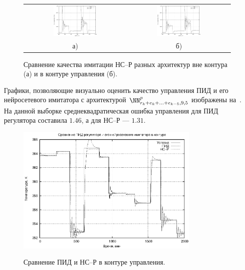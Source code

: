 \begin{figure}[h]
  \centering
  \begin{tabular}{cc}
    \includegraphics[width=0.45\textwidth,%
      totalheight=0.25\textheight]{cstr_e5r1_vs_e1r1_outloop_rus}
    &
    \includegraphics[width=0.45\textwidth,%
      totalheight=0.25\textheight]{cstr_e5r1_vs_e1r1_inloop_rus} \\
    а) & б) \\
  \end{tabular}
  \caption{Сравнение качества имитации НС--Р разных архитектур вне контура (а) и в контуре управления (б).}%
  \label{fig:cstr_pid_vs_nnc_contest_rus}
\end{figure}

Графики, позволяющие визуально оценить качество управления ПИД и его
нейросетевого имитатора с архитектурой
$\NN^p_{r_k+e_k+\ldots+e_{k-5},9,5}$ изображены
на~.  На данной выборке
среднеквадратическая ошибка управления для ПИД регулятора составила
$1.46$, а для НС--Р --- $1.31$.

\begin{figure}[h]
  \centering
  \includegraphics[width=0.8\textwidth,%
    totalheight=0.35\textheight]{cstr_pid_vs_nnc_inloop_rus} \\
  \caption{Сравнение ПИД и НС--Р в контуре управления.}%
  \label{fig:cstr_pid_vs_nnc_inloop_rus}
\end{figure}

